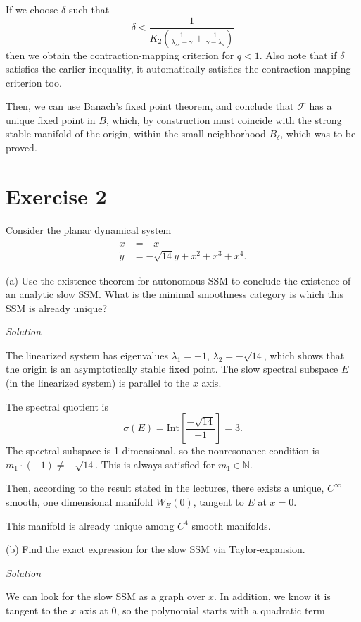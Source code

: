\documentclass[a4paper,11pt,pdftex]{article}
\begin{document}
If we choose $\delta$ such that 
$$
\delta < \frac{1}{K_2 \left( \frac{1}{\lambda_{ss} - \gamma} + \frac{1}{\gamma - \lambda_{s} }\right)}
$$
then we obtain the contraction-mapping criterion for $q<1$. Also note that if $\delta$ satisfies the earlier inequality, it automatically satisfies the contraction mapping criterion too. 

Then, we can use Banach's fixed point theorem, and conclude that $\mathcal{F}$ has a unique fixed point in $B$, which, by construction must coincide with the strong stable manifold of the origin, within the small neighborhood $B_\delta$, which was to be proved. 


\section*{Exercise 2}
Consider the planar dynamical system
\begin{align}
\label{8}
    \dot{x} &= -x \\
    \label{9}
    \dot{y} &= -\sqrt{14}y + x^2 + x^3 + x^4.
\end{align}

(a) Use the existence theorem for autonomous SSM to conclude the existence of an analytic slow SSM. What is the minimal smoothness category is which this SSM is already unique?

\emph{Solution}

The linearized system has eigenvalues $\lambda_1 = -1$, $\lambda_2 = -\sqrt{14}$, which shows that the origin is an asymptotically stable fixed point. The slow spectral subspace $E$ (in the linearized system) is parallel to the $x$ axis.

The spectral quotient is 
$$
\sigma(E) = \text{Int}\left[\frac{-\sqrt{14}}{-1}\right]=3.
$$
The spectral subspace is 1 dimensional, so the nonresonance condition is $m_1\cdot(-1)\neq -\sqrt{14}$. This is always satisfied for $m_1\in \mathbb{N}$.  

Then, according to the result stated in the lectures, there exists a unique, $C^{\infty}$ smooth, one dimensional manifold $W_E(0)$, tangent to $E$ at $x=0$. 

This manifold is already unique among $C^{4}$ smooth manifolds. 

(b) Find the exact expression for the slow SSM via Taylor-expansion. 

\emph{Solution}

We can look for the slow SSM as a graph over $x$. In addition, we know it is tangent to the $x$ axis at $0$, so the polynomial starts with a quadratic term
\end{document}
